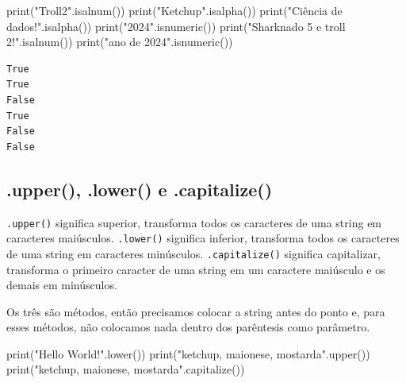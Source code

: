 \documentclass[
  letterpaper,
  DIV=11,
  numbers=noendperiod]{scrreprt}
\newenvironment{Shaded}{\begin{snugshade}}{\end{snugshade}}
\newcommand{\BuiltInTok}[1]{\textcolor[rgb]{0.00,0.23,0.31}{#1}}
\newcommand{\NormalTok}[1]{\textcolor[rgb]{0.00,0.23,0.31}{#1}}
\newcommand{\StringTok}[1]{\textcolor[rgb]{0.13,0.47,0.30}{#1}}
\begin{document}
\begin{Shaded}
\begin{Highlighting}[]
\BuiltInTok{print}\NormalTok{(}\StringTok{"Troll2"}\NormalTok{.isalnum())}
\BuiltInTok{print}\NormalTok{(}\StringTok{"Ketchup"}\NormalTok{.isalpha())}
\BuiltInTok{print}\NormalTok{(}\StringTok{"Ciência de dados!"}\NormalTok{.isalpha())}
\BuiltInTok{print}\NormalTok{(}\StringTok{"2024"}\NormalTok{.isnumeric())}
\BuiltInTok{print}\NormalTok{(}\StringTok{"Sharknado 5 e troll 2!"}\NormalTok{.isalnum())}
\BuiltInTok{print}\NormalTok{(}\StringTok{"ano de 2024"}\NormalTok{.isnumeric())}
\end{Highlighting}
\end{Shaded}

\begin{tcolorbox}[enhanced jigsaw, breakable, leftrule=.75mm, left=2mm, opacityback=0, bottomrule=.15mm, toprule=.15mm, rightrule=.15mm, arc=.35mm, colback=white]

\begin{verbatim}
True
True
False
True
False
False
\end{verbatim}

\end{tcolorbox}

\hypertarget{upper-.lower-e-.capitalize}{%
\subsection{.upper(), .lower() e
.capitalize()}\label{upper-.lower-e-.capitalize}}

\texttt{.upper()} significa superior, transforma todos os caracteres de
uma string em caracteres maiúsculos. \texttt{.lower()} significa
inferior, transforma todos os caracteres de uma string em caracteres
minúsculos. \texttt{.capitalize()} significa capitalizar, transforma o
primeiro caracter de uma string em um caractere maiúsculo e os demais em
minúsculos.

Os três são métodos, então precisamos colocar a string antes do ponto e,
para esses métodos, não colocamos nada dentro dos parêntesis como
parâmetro.

\begin{Shaded}
\begin{Highlighting}[]
\BuiltInTok{print}\NormalTok{(}\StringTok{"Hello World!"}\NormalTok{.lower())}
\BuiltInTok{print}\NormalTok{(}\StringTok{"ketchup, maionese, mostarda"}\NormalTok{.upper())}
\BuiltInTok{print}\NormalTok{(}\StringTok{"ketchup, maionese, mostarda"}\NormalTok{.capitalize())}
\end{Highlighting}
\end{Shaded}
\end{document}
